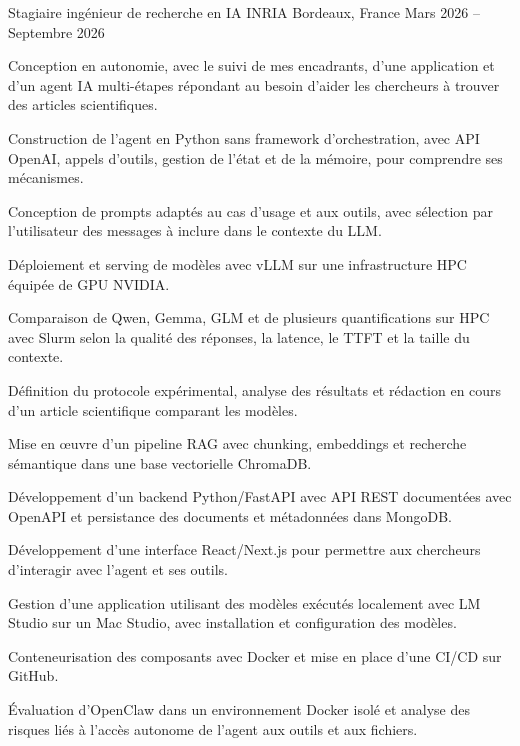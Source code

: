 
\begin{cventries}
  \cventry
    {Stagiaire ingénieur de recherche en IA}
    {INRIA}
    {Bordeaux, France}
    {Mars 2026 -- Septembre 2026}
    {
      \begin{cvitems}
        \item {Conception en autonomie, avec le suivi de mes encadrants, d’une application et d’un agent IA multi-étapes répondant au besoin d’aider les chercheurs à trouver des articles scientifiques.}
        \item {Construction de l’agent en Python sans framework d’orchestration, avec API OpenAI, appels d’outils, gestion de l’état et de la mémoire, pour comprendre ses mécanismes.}
        \item {Conception de prompts adaptés au cas d’usage et aux outils, avec sélection par l’utilisateur des messages à inclure dans le contexte du LLM.}
        \item {Déploiement et serving de modèles avec vLLM sur une infrastructure HPC équipée de GPU NVIDIA.}
        \item {Comparaison de Qwen, Gemma, GLM et de plusieurs quantifications sur HPC avec Slurm selon la qualité des réponses, la latence, le TTFT et la taille du contexte.}
        \item {Définition du protocole expérimental, analyse des résultats et rédaction en cours d’un article scientifique comparant les modèles.}
        \item {Mise en œuvre d’un pipeline RAG avec chunking, embeddings et recherche sémantique dans une base vectorielle ChromaDB.}
        \item {Développement d’un backend Python/FastAPI avec API REST documentées avec OpenAPI et persistance des documents et métadonnées dans MongoDB.}
        \item {Développement d’une interface React/Next.js pour permettre aux chercheurs d’interagir avec l’agent et ses outils.}
        \item {Gestion d’une application utilisant des modèles exécutés localement avec LM Studio sur un Mac Studio, avec installation et configuration des modèles.}
        \item {Conteneurisation des composants avec Docker et mise en place d’une CI/CD sur GitHub.}
        \item {Évaluation d’OpenClaw dans un environnement Docker isolé et analyse des risques liés à l’accès autonome de l’agent aux outils et aux fichiers.}
      \end{cvitems}
    }


\end{cventries}
